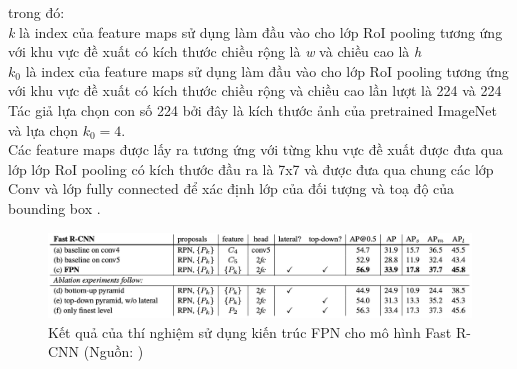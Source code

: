 {    \noindent
    trong đó: \\
    \textit{k} là index của feature maps  sử dụng làm đầu vào cho lớp RoI pooling tương ứng với khu vực đề xuất có kích thước chiều rộng là \textit{w} và chiều cao là \textit{h} \\
    $k_0$ là index của feature maps  sử dụng làm đầu vào cho lớp RoI pooling tương ứng với khu vực đề xuất có kích thước chiều rộng và chiều cao lần lượt là 224 và 224 \\
    Tác giả lựa chọn con số 224 bởi đây là kích thước ảnh của pretrained ImageNet và lựa chọn $k_0 = 4$. \\
    Các feature maps  được lấy ra tương ứng với từng khu vực đề xuất được đưa qua lớp lớp RoI pooling có kích thước đầu ra là 7x7 và được đưa qua chung các lớp Conv  và lớp fully connected  để xác định lớp của đối tượng và toạ độ của bounding box .

    \begin{figure}[H]
        \centering
        \includegraphics[width=12cm] {images/fpn_results_2}
        \caption{Kết quả của thí nghiệm sử dụng kiến trúc FPN cho mô hình Fast R-CNN  (Nguồn: \cite{lin2017feature})}
        \label{fig:fpn_results}
    \end{figure}
    
}
